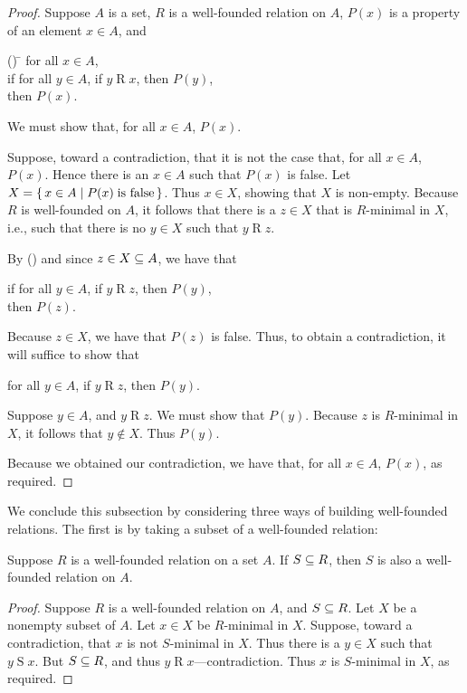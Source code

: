 \begin{proof}
Suppose $A$ is a set, $R$ is a well-founded relation on $A$,
$P(x)$ is a property of an element $x\in A$, and
\begin{ctabbing}
(\ddag) \=\+ for all $x\in A$, \\
if for all $y\in A$, if $y\mathrel{R}x$, then $P(y)$, \\
then $P(x)$.
\end{ctabbing}
We must show that, for all $x\in A$, $P(x)$.

Suppose, toward a contradiction, that it is not the case
that, for all $x\in A$, $P(x)$.  Hence there is an $x\in A$ such
that $P(x)$ is false.
Let $X=\{ \, x\in A \mid P(x)\;\allowbreak\mbox{is false}\allowbreak \, \}$.  Thus
$x\in X$, showing that $X$ is non-empty.
Because $R$ is well-founded on $A$, it follows that there is a $z\in X$
that is $R$-minimal in $X$, i.e., such that there is no $y\in X$ such that
$y\mathrel{R}z$.

By (\ddag) and since $z\in X\subseteq A$, we have that
\begin{ctabbing}
if for all $y\in A$, if $y\mathrel{R}z$, then $P(y)$, \\
then $P(z)$.
\end{ctabbing}
Because $z\in X$, we have that $P(z)$ is false.
Thus, to obtain a contradiction, it will suffice to
show that
\begin{ctabbing}
for all $y\in A$, if $y\mathrel{R}z$, then $P(y)$.
\end{ctabbing}
Suppose $y\in A$, and $y\mathrel{R}z$. We must show that $P(y)$.
Because $z$ is $R$-minimal in $X$, it follows that $y\not\in X$.
Thus $P(y)$.

Because we obtained our contradiction, we have that,
for all $x\in A$, $P(x)$, as required.
\end{proof}

We conclude this subsection by considering three ways of building
well-founded relations.  The first is by taking a subset of
a well-founded relation:

\begin{proposition}
\label{WellFoundedSubset}
Suppose $R$ is a well-founded relation on a set $A$.  If $S\subseteq R$,
then $S$ is also a well-founded relation on $A$.
\end{proposition}

\begin{proof}
Suppose $R$ is a well-founded relation on $A$, and $S\subseteq R$.  Let
$X$ be a nonempty subset of $A$.  Let $x\in X$ be $R$-minimal in $X$.
Suppose, toward a contradiction, that $x$ is not $S$-minimal in $X$.
Thus there is a $y\in X$ such that $y\mathrel{S}x$.  But $S\subseteq R$,
and thus $y\mathrel{R}x$---contradiction.  Thus $x$ is $S$-minimal
in $X$, as required.
\end{proof}

